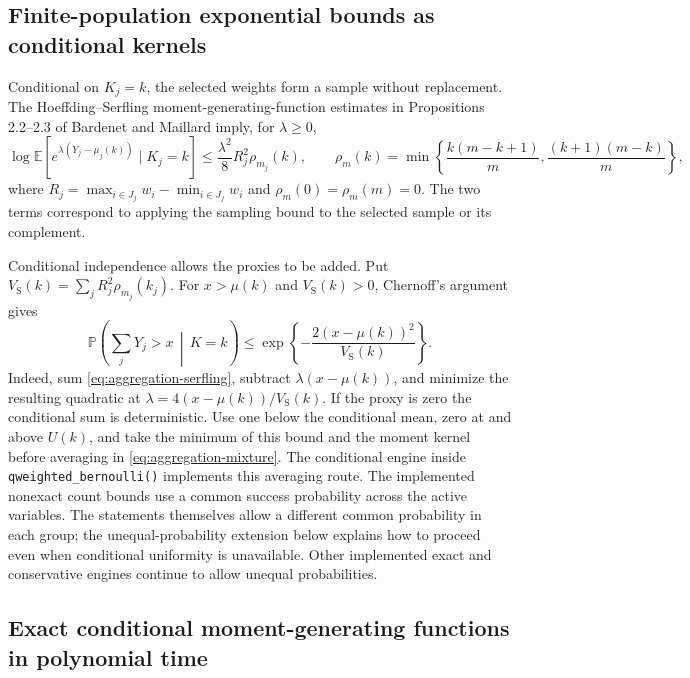 \documentclass[11pt,letterpaper]{article}
\numberwithin{equation}{section}
\theoremstyle{definition}
\theoremstyle{remark}
\newcommand{\E}{\mathbb E}
\newcommand{\Pbb}{\mathbb P}
\begin{document}
\subsection{Finite-population exponential bounds as conditional kernels}

Conditional on $K_j=k$, the selected weights form a sample without
replacement. The Hoeffding--Serfling moment-generating-function estimates
in Propositions 2.2--2.3 of Bardenet and Maillard
\cite{bardenetmaillard2015} imply, for
$\lambda\ge0$,
\begin{equation}
 \log\E\!\left[e^{\lambda(Y_j-\mu_j(k))}\mid K_j=k\right]
 \le\frac{\lambda^2}{8}R_j^2\rho_{m_j}(k),\qquad
 \rho_m(k)=\min\left\{\frac{k(m-k+1)}m,
                         \frac{(k+1)(m-k)}m\right\},
 \label{eq:aggregation-serfling}
\end{equation}
where $R_j=\max_{i\in J_j}w_i-\min_{i\in J_j}w_i$ and
$\rho_m(0)=\rho_m(m)=0$. The two terms correspond to applying the
sampling bound to the selected sample or its complement.

Conditional independence allows the proxies to be added. Put
$V_{\mathrm S}(k)=\sum_jR_j^2\rho_{m_j}(k_j)$. For $x>\mu(k)$ and
$V_{\mathrm S}(k)>0$, Chernoff's argument gives
\begin{equation}
 \Pbb\!\left(\sum_jY_j>x\,\middle|\,K=k\right)
 \le \exp\!\left\{-\frac{2(x-\mu(k))^2}{V_{\mathrm S}(k)}\right\}.
 \label{eq:aggregation-serfling-tail}
\end{equation}
Indeed, sum \eqref{eq:aggregation-serfling}, subtract
$\lambda(x-\mu(k))$, and minimize the resulting quadratic at
$\lambda=4(x-\mu(k))/V_{\mathrm S}(k)$. If the proxy is zero the
conditional sum is deterministic. Use one below the conditional mean,
zero at and above $U(k)$, and take the minimum of this bound and the
moment kernel before averaging in \eqref{eq:aggregation-mixture}.
The conditional engine inside \texttt{qweighted\_bernoulli()} implements
this averaging route. The implemented nonexact count bounds use a common
success probability across the active variables. The statements themselves
allow a different common probability in each group; the
unequal-probability extension below explains how to proceed even when
conditional uniformity is unavailable. Other implemented exact and
conservative engines continue to allow unequal probabilities.

\subsection{Exact conditional moment-generating functions in polynomial time}
\end{document}
